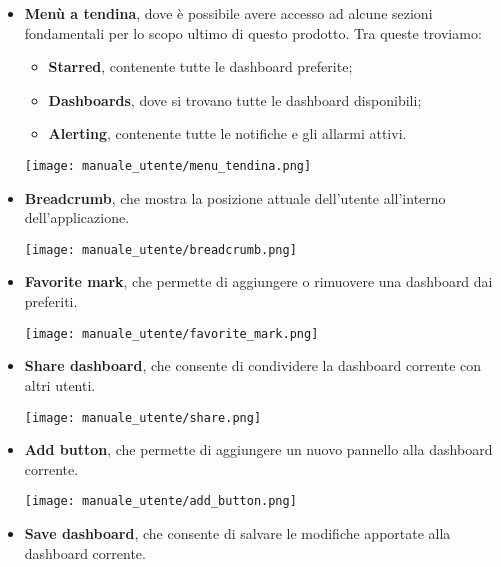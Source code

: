 \begin{itemize}
    \item \textbf{Menù a tendina}, dove è possibile avere accesso ad alcune sezioni fondamentali per lo scopo ultimo di questo prodotto. Tra queste troviamo:
        \begin{itemize}
            \item \textbf{Starred}, contenente tutte le dashboard preferite;
            \item \textbf{Dashboards}, dove si trovano tutte le dashboard disponibili;
            \item \textbf{Alerting}, contenente tutte le notifiche e gli allarmi attivi.
        \end{itemize}
        \begin{center}
            \texttt{[image: manuale\_utente/menu\_tendina.png]}
        \end{center}
    \item \textbf{Breadcrumb}, che mostra la posizione attuale dell'utente all'interno dell'applicazione.
        \begin{center}
            \texttt{[image: manuale\_utente/breadcrumb.png]}
        \end{center}
    \item \textbf{Favorite mark}, che permette di aggiungere o rimuovere una dashboard dai preferiti.
        \begin{center}
            \texttt{[image: manuale\_utente/favorite\_mark.png]}
        \end{center}
    \item \textbf{Share dashboard}, che consente di condividere la dashboard corrente con altri utenti.
        \begin{center}
            \texttt{[image: manuale\_utente/share.png]}
        \end{center}
    \item \textbf{Add button}, che permette di aggiungere un nuovo pannello alla dashboard corrente.
        \begin{center}
            \texttt{[image: manuale\_utente/add\_button.png]}
        \end{center}
    \item \textbf{Save dashboard}, che consente di salvare le modifiche apportate alla dashboard corrente.

\end{itemize}
